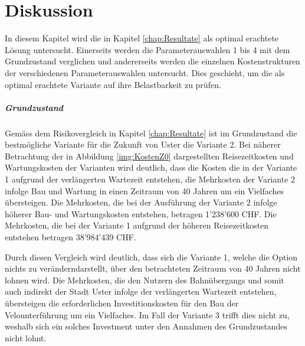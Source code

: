 %
%
%
%

\chapter{Diskussion}
\label{chap:Diskussion}

In diesem Kapitel wird die in Kapitel \ref{chap:Resultate} als optimal erachtete Lösung untersucht. Einerseits werden die Parameterauswahlen 1 bis 4 mit dem Grundzustand verglichen und andererseits werden die einzelnen Kostenstrukturen der verschiedenen Parameterauswahlen untersucht. Dies geschieht, um die als optimal erachtete Variante auf ihre Belastbarkeit zu prüfen.

\paragraph{Grundzustand}

Gemäss dem Risikovergleich in Kapitel \ref{chap:Resultate} ist im Grundzustand die bestmögliche Variante für die Zukunft von Uster die Variante 2.  
Bei näherer Betrachtung der in Abbildung \ref{img:KostenZ0} dargestellten Reisezeitkosten und Wartungskosten der Varianten wird deutlich, dass die Kosten die in der Variante 1 aufgrund der verlängerten Wartezeit entstehen, die Mehrkosten der Variante 2 infolge Bau und Wartung in einen Zeitraum von 40 Jahren um ein Vielfaches übersteigen. Die Mehrkosten, die bei der Ausführung der Variante 2 infolge höherer Bau- und Wartungskosten entstehen, betragen 1'238'600 CHF. Die Mehrkosten, die bei der Variante 1 aufgrund der höheren Reisezeitkosten entstehen betragen 38'984'439 CHF. 

Durch diesen Vergleich wird deutlich, dass sich die Variante 1, welche die Option \flqq nichts zu verändern\frqq darstellt, über den betrachteten Zeitraum von 40 Jahren nicht lohnen wird. Die Mehrkosten, die den Nutzern des Bahnübergangs und somit auch indirekt der Stadt Uster infolge der verlängerten Wartezeit entstehen, übersteigen die erforderlichen Investitionskosten für den Bau der Velounterführung um ein Vielfaches. Im Fall der Variante 3 trifft dies nicht zu, weshalb sich ein solches Investment unter den Annahmen des Grundzustandes nicht lohnt.

